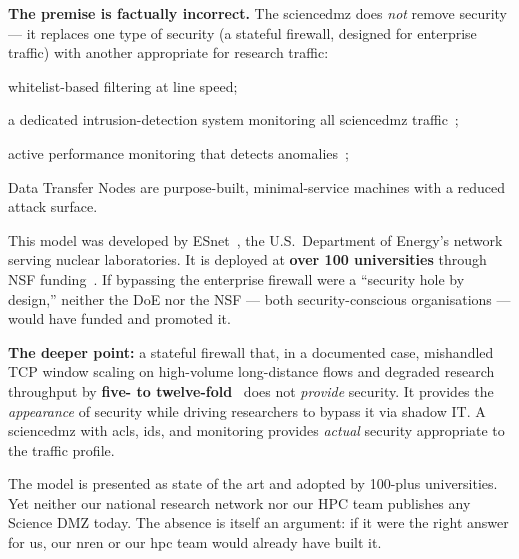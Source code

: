 \begin{answerbox}[Answer to Q3.3]
\textbf{The premise is factually incorrect.} The \gls{sciencedmz} does \emph{not} remove security --- it replaces one type of security (a stateful firewall, designed for enterprise traffic) with another appropriate for research traffic:

\begin{description}[nosep]
    \item[\gls{acl}s on routers:] whitelist-based filtering at line speed;
    \item[Zeek (formerly Bro) \gls{ids}:] a dedicated intrusion-detection system monitoring all \gls{sciencedmz} traffic~\cite{paxson1999};
    \item[perfSONAR:] active performance monitoring that detects anomalies~\cite{perfsonar};
    \item[\gls{dtn} hardening:] Data Transfer Nodes are purpose-built, minimal-service machines with a reduced attack surface.
\end{description}

This model was developed by ESnet~\cite{dart2013}, the U.S.\ Department of Energy's network serving nuclear laboratories. It is deployed at \textbf{over 100 universities} through NSF funding~\cite{esnet-history,nsf-cc}. If bypassing the enterprise firewall were a ``security hole by design,'' neither the DoE nor the NSF --- both security-conscious organisations --- would have funded and promoted it.

\medskip\noindent\textbf{The deeper point:} a stateful firewall that, in a documented case, mishandled TCP window scaling on high-volume long-distance flows and degraded research throughput by \textbf{five- to twelve-fold}~\cite{esnet-pennstate} does not \emph{provide} security. It provides the \emph{appearance} of security while driving researchers to bypass it via shadow IT. A \gls{sciencedmz} with \gls{acl}s, \gls{ids}, and monitoring provides \emph{actual} security appropriate to the traffic profile.
\end{answerbox}

\bigskip

\begin{questionbox}
The model is presented as state of the art and adopted by 100-plus universities. Yet neither our national research network nor our HPC team publishes any Science DMZ today. The absence is itself an argument: if it were the right answer for us, our \gls{nren} or our \gls{hpc} team would already have built it.
\end{questionbox}


